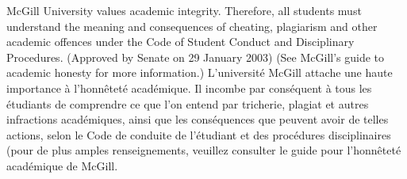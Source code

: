\documentclass[12]{article}
\begin{document}
\newline
\noindent
McGill University values academic integrity. Therefore, all students
must understand the meaning and consequences of cheating, plagiarism
and other academic offences under the Code of Student Conduct and
Disciplinary Procedures. (Approved by Senate on 29 January 2003) (See
McGill’s guide to academic honesty for more information.)
\vskip 0.05in
\noindent
L'université McGill attache une haute importance à l’honnêteté
académique. Il incombe par conséquent à tous les étudiants de
comprendre ce que l'on entend par tricherie, plagiat et autres
infractions académiques, ainsi que les conséquences que peuvent
avoir de telles actions, selon le Code de conduite de l'étudiant et
des procédures disciplinaires (pour de plus amples renseignements,
veuillez consulter le guide pour l’honnêteté académique de McGill.
\end{document}
